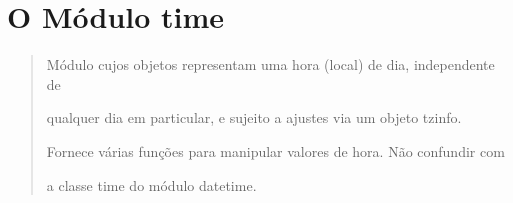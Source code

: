 \documentclass[letterpaper,10pt,brazil]{sphinxmanual}
\begin{document}
\begin{sphinxVerbatim}[commandchars=\\\{\}]
  
\end{sphinxVerbatim}

\begin{sphinxVerbatim}[commandchars=\\\{\}]
\end{sphinxVerbatim}

\begin{sphinxVerbatim}[commandchars=\\\{\}]
\end{sphinxVerbatim}

\begin{sphinxVerbatim}[commandchars=\\\{\}]
\end{sphinxVerbatim}

\begin{sphinxVerbatim}[commandchars=\\\{\}]
\end{sphinxVerbatim}

\begin{sphinxVerbatim}[commandchars=\\\{\}]
\end{sphinxVerbatim}


\section{O Módulo time}
\label{\detokenize{content/date_time:o-modulo-time}}\begin{quote}

\begin{DUlineblock}{0em}
\item[]
\begin{DUlineblock}{\DUlineblockindent}
\item[] Módulo cujos objetos representam uma hora (local) de dia, independente de
\end{DUlineblock}
\item[] qualquer dia em particular, e sujeito a ajustes via um objeto tzinfo.
\item[]
\begin{DUlineblock}{\DUlineblockindent}
\item[] Fornece várias funções para manipular valores de hora. Não confundir com
\end{DUlineblock}
\item[] a classe time do módulo datetime.
\end{DUlineblock}
\end{quote}
\end{document}
